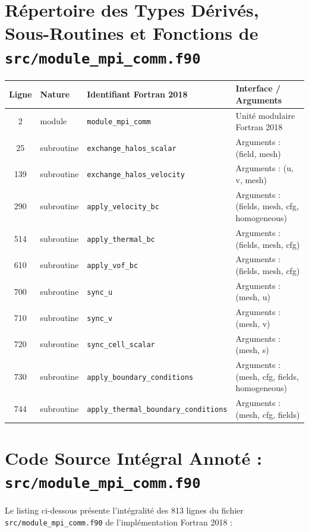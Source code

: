 \documentclass[10pt,a4paper,oneside]{book}
\begin{document}
\section{Répertoire des Types Dérivés, Sous-Routines et Fonctions de \texttt{src/module\_mpi\_comm.f90}}
\begin{center}\small
\begin{tabular}{clll}
\toprule
\textbf{Ligne} & \textbf{Nature} & \textbf{Identifiant Fortran 2018} & \textbf{Interface / Arguments} \\
\midrule
2 & module & \texttt{module\_mpi\_comm} & Unité modulaire Fortran 2018 \\
25 & subroutine & \texttt{exchange\_halos\_scalar} & Arguments : (field, mesh) \\
139 & subroutine & \texttt{exchange\_halos\_velocity} & Arguments : (u, v, mesh) \\
290 & subroutine & \texttt{apply\_velocity\_bc} & Arguments : (fields, mesh, cfg, homogeneous) \\
514 & subroutine & \texttt{apply\_thermal\_bc} & Arguments : (fields, mesh, cfg) \\
610 & subroutine & \texttt{apply\_vof\_bc} & Arguments : (fields, mesh, cfg) \\
700 & subroutine & \texttt{sync\_u} & Arguments : (mesh, u) \\
710 & subroutine & \texttt{sync\_v} & Arguments : (mesh, v) \\
720 & subroutine & \texttt{sync\_cell\_scalar} & Arguments : (mesh, s) \\
730 & subroutine & \texttt{apply\_boundary\_conditions} & Arguments : (mesh, cfg, fields, homogeneous) \\
744 & subroutine & \texttt{apply\_thermal\_boundary\_conditions} & Arguments : (mesh, cfg, fields) \\
\bottomrule
\end{tabular}
\end{center}

\section{Code Source Intégral Annoté : \texttt{src/module\_mpi\_comm.f90}}
Le listing ci-dessous présente l'intégralité des 813 lignes du fichier \texttt{src/module\_mpi\_comm.f90} de l'implémentation Fortran 2018 :
\end{document}
